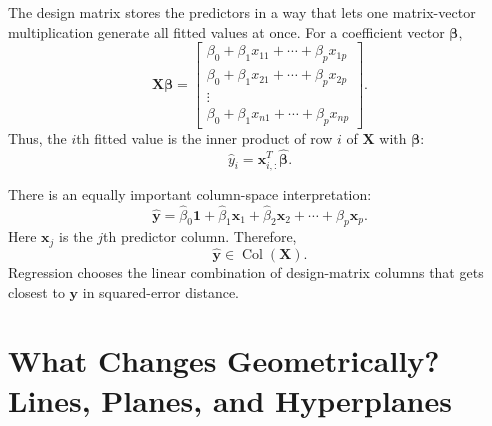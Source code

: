 The design matrix stores the predictors in a way that lets one matrix-vector multiplication generate all fitted values at once.  For a coefficient vector \(\boldsymbol{\beta}\),
\begin{equation}
  \mathbf{X}\boldsymbol{\beta}
  =\begin{bmatrix}
    \beta_0+\beta_1x_{11}+\cdots+\beta_px_{1p}\\
    \beta_0+\beta_1x_{21}+\cdots+\beta_px_{2p}\\
    \vdots\\
    \beta_0+\beta_1x_{n1}+\cdots+\beta_px_{np}
  \end{bmatrix}.
\end{equation}
Thus, the \(i\)th fitted value is the inner product of row \(i\) of \(\mathbf{X}\) with \(\boldsymbol{\beta}\):
\begin{equation}
  \widehat{y}_i=\mathbf{x}_{i,:}^T\widehat{\boldsymbol{\beta}}.
\end{equation}

There is an equally important column-space interpretation:
\begin{equation}
  \widehat{\mathbf{y}}
  =\widehat{\beta}_0\mathbf{1}
  +\widehat{\beta}_1\mathbf{x}_1
  +\widehat{\beta}_2\mathbf{x}_2
  +\cdots
  +\widehat{\beta}_p\mathbf{x}_p.
\end{equation}
Here \(\mathbf{x}_j\) is the \(j\)th predictor column.  Therefore,
\begin{equation}
  \widehat{\mathbf{y}}\in\operatorname{Col}(\mathbf{X}).
\end{equation}
Regression chooses the linear combination of design-matrix columns that gets closest to \(\mathbf{y}\) in squared-error distance.

\section{What Changes Geometrically? Lines, Planes, and Hyperplanes}

